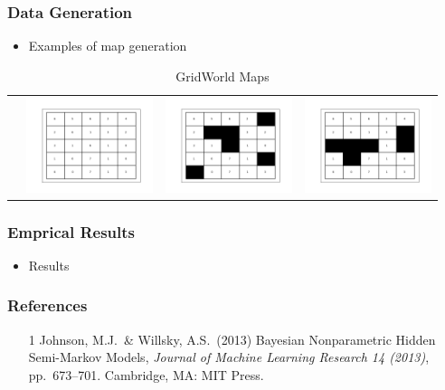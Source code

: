 \documentclass{beamer}
\begin{document}
\begin{frame}
    \frametitle{Data Generation}
    \begin{itemize}
        \item Examples of map generation
    \end{itemize}
        \newcommand{\addmapa}{\includegraphics[width=10em]{data/Model1/5x5;4;free.png}}
        \newcommand{\addmapb}{\includegraphics[width=10em]{data/Model2/5x5;4;6box.png}}
        \newcommand{\addmapc}{\includegraphics[width=10em]{data/Model3/5x5;4;6sep.png}}
        \begin{table}[H]
        \sffamily
        \centering
        \begin{tabular}{l*3{C}@{}}
        & \addmapa & \addmapb & \addmapc \\
        \end{tabular}
        \caption{GridWorld Maps}
        \end{table}
\end{frame}

\begin{frame}
    \frametitle{Emprical Results}
    \begin{itemize}
        \item Results
    \end{itemize}
\end{frame}


\begin{frame}
    \frametitle{References}
    \begin{itemize}
        \item [1] Johnson, M.J.\ \& Willsky, A.S.\ (2013) Bayesian Nonparametric Hidden Semi-Markov Models, {\it Journal of Machine Learning Research 14 (2013)},
        pp.\ 673--701. Cambridge, MA: MIT Press.
    \end{itemize}
\end{frame}
\end{document}
